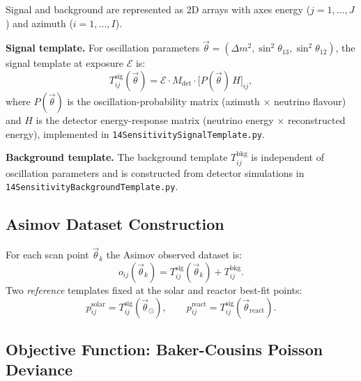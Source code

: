 \documentclass[12pt,a4paper]{article}
\newcommand{\Ecal}{\mathcal{E}}          %
\newcommand{\Mdet}{M_{\mathrm{det}}}     %
\newcommand{\Tsig}{T^{\mathrm{sig}}_{ij}}
\newcommand{\Tbkg}{T^{\mathrm{bkg}}_{ij}}
\newcommand{\oij}{o_{ij}}
\begin{document}
Signal and background are represented as 2D arrays with axes
energy ($j=1,\ldots,J$) and azimuth ($i=1,\ldots,I$).

\medskip
\noindent\textbf{Signal template.}
For oscillation parameters $\vec{\theta} = (\Delta m^2,\sin^2\theta_{13},\sin^2\theta_{12})$,
the signal template at exposure $\Ecal$ is:
\begin{equation}
  \Tsig(\vec{\theta}) = \Ecal\cdot\Mdet\cdot\bigl[P(\vec{\theta})\,H\bigr]_{ij},
  \label{eq:signal_template}
\end{equation}
where $P(\vec{\theta})$ is the oscillation-probability matrix
(azimuth $\times$ neutrino flavour) and $H$ is the detector energy-response
matrix (neutrino energy $\times$ reconstructed energy),
implemented in \texttt{14SensitivitySignalTemplate.py}.

\medskip
\noindent\textbf{Background template.}
The background template $\Tbkg$ is independent of oscillation parameters
and is constructed from detector simulations in
\texttt{14SensitivityBackgroundTemplate.py}.

\subsection{Asimov Dataset Construction}
\label{sec:sens_asimov}

For each scan point $\vec{\theta}_k$ the Asimov observed dataset is:
\begin{equation}
  \oij(\vec{\theta}_k) = \Tsig(\vec{\theta}_k) + \Tbkg.
  \label{eq:sens_asimov}
\end{equation}
Two \emph{reference} templates fixed at the solar and reactor best-fit
points:
\begin{equation}
  p^{\mathrm{solar}}_{ij} = \Tsig(\vec{\theta}_{\odot}),
  \qquad
  p^{\mathrm{react}}_{ij} = \Tsig(\vec{\theta}_{\mathrm{react}}).
  \label{eq:reference_templates}
\end{equation}

\subsection{Objective Function: Baker-Cousins Poisson Deviance}
\label{sec:sens_objective}
\end{document}
